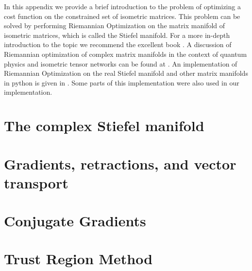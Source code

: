 In this appendix we provide a brief introduction to the problem of optimizing a cost function on the constrained set of isometric matrices. This problem can be solved by performing Riemannian Optimization on the matrix manifold of isometric matrices, which is called the Stiefel manifold. For a more in-depth introduction to the topic we recommend the excellent book \cite{cite:optimization_on_matrix_manifolds}. A discussion of Riemannian optimization of complex matrix manifolds in the context of quantum physics and isometric tensor networks can be found at \cite{cite:riemannian_geometry_automatic_differentiation_quantum_physics, cite:riemannian_optimization_isometric_tensor_networks}. An implementation of Riemannian Optimization on the real Stiefel manifold and other matrix manifolds in python is given in \cite{cite:pymanopt}. Some parts of this implementation were also used in our implementation.

\section{The complex Stiefel manifold}


\section{Gradients, retractions, and vector transport}


\section{Conjugate Gradients}

\section{Trust Region Method}
